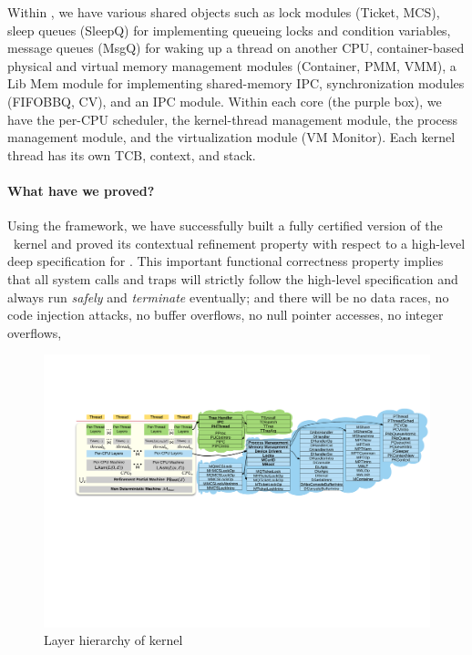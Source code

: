 Within \cCTOS, we have various shared objects such as lock modules
(Ticket, MCS), sleep queues (SleepQ) for implementing queueing locks
and condition variables, message queues (MsgQ) for waking up a
thread on another CPU, container-based physical and virtual memory
management modules (Container, PMM, VMM), a Lib Mem module for
implementing shared-memory IPC, synchronization modules (FIFOBBQ,
CV), and an IPC module. Within each core (the purple box), we have
the per-CPU scheduler, the kernel-thread management module, the process
management module, and the virtualization module (VM Monitor). Each
kernel thread has its own TCB, context, and stack.

\paragraph{What have we proved?}
Using the \CTOS{} framework, we have successfully built a fully certified version of
the \cCTOS\ kernel and proved its contextual refinement property with
respect to a high-level deep specification for \cCTOS.  This important
functional correctness property implies that all system calls and
traps will strictly follow the high-level specification and always run
{\em safely} and {\em terminate} eventually; and there will be no data
races, no code injection attacks, no buffer overflows, no null pointer
accesses, no integer overflows, \etc{}

\begin{figure}[t]
\includegraphics[width=1.0\textwidth]{figs/layer_diagram.pdf}
\caption{Layer hierarchy of \cCTOS{} kernel}
\label{fig:layer_diagram}
\hrulefill
\end{figure}

